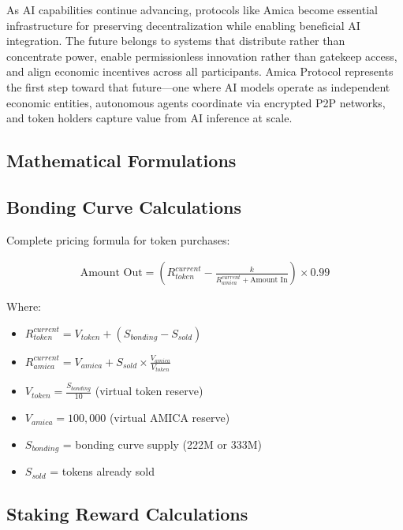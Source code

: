 \documentclass{article}
\begin{document}
As AI capabilities continue advancing, protocols like Amica become essential infrastructure for preserving decentralization while enabling beneficial AI integration. The future belongs to systems that distribute rather than concentrate power, enable permissionless innovation rather than gatekeep access, and align economic incentives across all participants. Amica Protocol represents the first step toward that future—one where AI models operate as independent economic entities, autonomous agents coordinate via encrypted P2P networks, and token holders capture value from AI inference at scale.

\begin{appendices}

\section{Mathematical Formulations}

\subsection{Bonding Curve Calculations}

Complete pricing formula for token purchases:

\begin{align}
\text{Amount Out} = \left(R_{token}^{current} - \frac{k}{R_{amica}^{current} + \text{Amount In}}\right) \times 0.99
\end{align}

Where:
\begin{itemize}
    \item $R_{token}^{current} = V_{token} + (S_{bonding} - S_{sold})$
    \item $R_{amica}^{current} = V_{amica} + S_{sold} \times \frac{V_{amica}}{V_{token}}$
    \item $V_{token} = \frac{S_{bonding}}{10}$ (virtual token reserve)
    \item $V_{amica} = 100,000$ (virtual AMICA reserve)
    \item $S_{bonding}$ = bonding curve supply (222M or 333M)
    \item $S_{sold}$ = tokens already sold
\end{itemize}

\subsection{Staking Reward Calculations}


\end{appendices}
\end{document}
